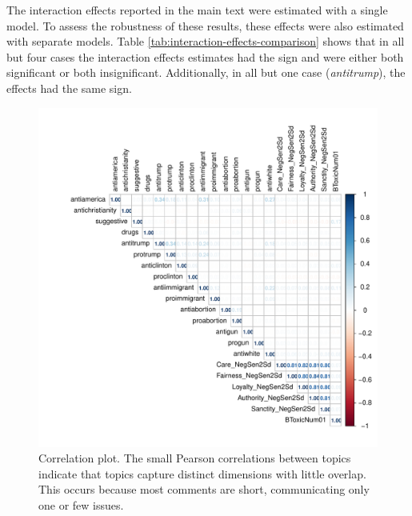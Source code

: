 \documentclass{article}
\begin{document}




\clearpage



\clearpage






The interaction effects reported in the main text were estimated with a single model. To assess the robustness of these results, these effects were also estimated with separate models. Table \ref{tab:interaction-effects-comparison} shows that in all but four cases the interaction effects estimates had the sign and were either both significant or both insignificant. Additionally, in all but one case (\textit{antitrump}), the effects had the same sign.


\clearpage

\clearpage

\begin{figure}[h]
    \centering
    \includegraphics[width=1\linewidth]{figures/corrplot_topics.pdf}
    \caption{Correlation plot. The small Pearson correlations between topics indicate that topics capture distinct dimensions with little overlap. This occurs because most comments are short, communicating only one or few issues.}
    \label{fig:corrplot-topics}
\end{figure}
\clearpage
\end{document}
